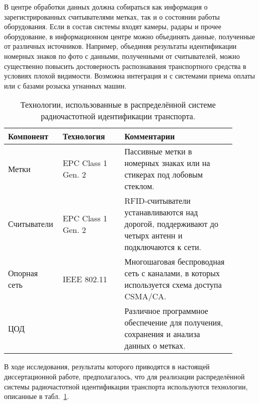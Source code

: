 В центре обработки данных должна собираться как информация о зарегистрированных считывателями метках, так и о состоянии работы оборудования. Если в состав системы входят камеры, радары и прочее оборудование, в информационном центре можно объединять данные, полученные от различных источников. Например, объединяя результаты идентификации номерных знаков по фото с данными, полученными от считывателей, можно существенно повысить достоверность распознавания транспортного средства в условиях плохой видимости. Возможна интеграция и с системами приема оплаты или с базами розыска угнанных машин.

\begin{table}[ht!]
    \renewcommand{\arraystretch}{1.3}
    \caption{Технологии, использованные в распределённой системе радиочастотной идентификации транспорта.}
    \label{table:ch1_technologies}
	\begin{tabular}{ |p{0.17\linewidth}|p{0.26\linewidth}|p{0.47\linewidth}| }\hline
		Компонент & Технология & Комментарии\\\hline\hline
		Метки & EPC Class 1 Gen. 2 & Пассивные метки в номерных знаках или на стикерах под лобовым стеклом.\\\hline
		Считыватели & EPC Class 1 Gen. 2 & RFID-считыватели устанавливаются над дорогой, поддерживают до четырх антенн и подключаются к сети.\\\hline
		Опорная сеть & IEEE 802.11 & Многошаговая беспроводная сеть с каналами, в которых используется схема доступа CSMA/CA.\\\hline
		ЦОД &  & Различное программное обеспечение для получения, сохранения и анализа данных о метках.\\\hline
	\end{tabular}

\end{table}

В ходе исследования, результаты которого приводятся в настоящей диссертационной работе, предполагалось, что для реализации распределённой системы радиочастотной идентификации транспорта используются технологии, описанные в табл.~\ref{table:ch1_technologies}.



